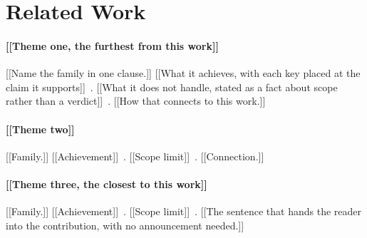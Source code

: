 \section{Related Work}
\label{sec:related}

\paragraph{[[Theme one, the furthest from this work]]}
[[Name the family in one clause.]]
[[What it achieves, with each key placed at the claim it supports]]~\cite{[[key1]]}.
[[What it does not handle, stated as a fact about scope rather than a verdict]]~\cite{[[key2]]}.
[[How that connects to this work.]]

\paragraph{[[Theme two]]}
[[Family.]]
[[Achievement]]~\cite{[[key3]]}.
[[Scope limit]]~\cite{[[key4]]}.
[[Connection.]]

\paragraph{[[Theme three, the closest to this work]]}
[[Family.]]
[[Achievement]]~\cite{[[key5]]}.
[[Scope limit]]~\cite{[[key6]]}.
[[The sentence that hands the reader into the contribution, with no announcement needed.]]
